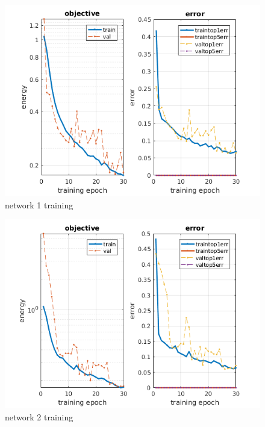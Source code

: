 \documentclass[]{report}
\begin{document}
\begin{figure}[h]
	\begin{center}
		\includegraphics[scale=0.5]{init_1.png}
		\caption{network 1 training}
		\label{fig:training1}
	\end{center}
\end{figure}

\begin{figure}[h]
	\begin{center}
		\includegraphics[scale=0.5]{init_2.png}
		\caption{network 2 training}
		\label{fig:training2}
	\end{center}
\end{figure}
\end{document}

